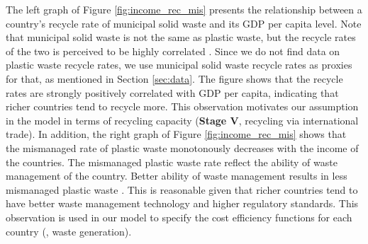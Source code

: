 \documentclass[dvipsnames]{article}
\begin{document}
The left graph of Figure \ref{fig:income_rec_mis} presents the relationship between a country's recycle rate of municipal solid waste and its GDP per capita level. Note that municipal solid waste is not the same as plastic waste, but the recycle rates of the two is perceived to be highly correlated \cite{epa2018}. Since we do not find data on plastic waste recycle rates, we use municipal solid waste recycle rates as proxies for that, as mentioned in Section \ref{sec:data}. The figure shows that the recycle rates are strongly positively correlated with GDP per capita, indicating that richer countries tend to recycle more. This observation motivates our assumption in the model in terms of recycling capacity (\textbf{Stage V}, recycling via international trade).
In addition, the right graph of Figure \ref{fig:income_rec_mis} shows that the mismanaged rate of plastic waste monotonously decreases with the income of the countries. The mismanaged plastic waste rate reflect the ability of waste management of the country. Better ability of waste management results in less mismanaged plastic waste . This is reasonable given that richer countries tend to have better waste management technology and higher regulatory standards. This observation is used in our model to specify the cost efficiency functions for each country (, waste generation).
\end{document}
